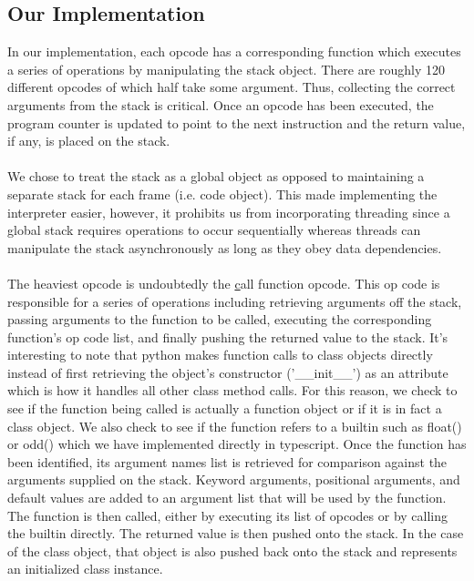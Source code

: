 \documentclass{article}
\begin{document}
\subsection{Our Implementation}
In our implementation, each opcode has a corresponding function which executes a series of operations by manipulating the stack object.  There are roughly 120 different opcodes of which half take some argument. Thus, collecting the correct arguments from the stack is critical. Once an opcode has been executed, the program counter is updated to point to the next instruction and the return value, if any, is placed on the stack.\\
\\
We chose to treat the stack as a global object as opposed to maintaining a separate stack for each frame (i.e. code object).  This made implementing the interpreter easier, however, it prohibits us from incorporating threading since a global stack requires operations to occur sequentially whereas threads can manipulate the stack asynchronously as long as they obey data dependencies.\\
\\
The heaviest opcode is undoubtedly the {\underline call function} opcode.  This op code is responsible for a series of operations including retrieving arguments off the stack, passing arguments to the function to be called, executing the corresponding function's op code list, and finally pushing the returned value to the stack.  It's interesting to note that python makes function calls to class objects directly instead of first retrieving the object's constructor ('\_\_init\_\_') as an attribute which is how it handles all other class method calls.  For this reason, we check to see if the function being called is actually a function object or if it is in fact a class object.  We also check to see if the function refers to a builtin such as float() or odd() which we have implemented directly in typescript.  Once the function has been identified, its argument names list is retrieved for comparison against the arguments supplied on the stack.  Keyword arguments, positional arguments, and default values are added to an argument list that will be used by the function.  The function is then called, either by executing its list of opcodes or by calling the builtin directly.  The returned value is then pushed onto the stack.  In the case of the class object, that object is also pushed back onto the stack and represents an initialized class instance.\\
\\
\end{document}
